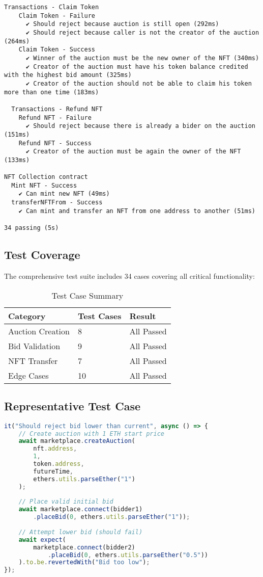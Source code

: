\documentclass{article}
\begin{document}
\begin{lstlisting}[caption={Hardhat Test Results},basicstyle=\footnotesize\ttfamily]
  Transactions - Claim Token
    Claim Token - Failure
      ✔ Should reject because auction is still open (292ms)
      ✔ Should reject because caller is not the creator of the auction (264ms)
    Claim Token - Success
      ✔ Winner of the auction must be the new owner of the NFT (340ms)
      ✔ Creator of the auction must have his token balance credited with the highest bid amount (325ms)
      ✔ Creator of the auction should not be able to claim his token more than one time (183ms)
  
  Transactions - Refund NFT
    Refund NFT - Failure
      ✔ Should reject because there is already a bider on the auction (151ms)
    Refund NFT - Success
      ✔ Creator of the auction must be again the owner of the NFT (133ms)

NFT Collection contract
  Mint NFT - Success
    ✔ Can mint new NFT (49ms)
  transferNFTFrom - Success
    ✔ Can mint and transfer an NFT from one address to another (51ms)

34 passing (5s)
\end{lstlisting}

\subsection{Test Coverage}
The comprehensive test suite includes 34 cases covering all critical functionality:

\begin{table}[h]
\centering
\begin{tabular}{lll}
\toprule
\textbf{Category} & \textbf{Test Cases} & \textbf{Result} \\
\midrule
Auction Creation & 8 & All Passed \\
Bid Validation & 9 & All Passed \\
NFT Transfer & 7 & All Passed \\
Edge Cases & 10 & All Passed \\
\bottomrule
\end{tabular}
\caption{Test Case Summary}
\end{table}

\subsection{Representative Test Case}
\begin{lstlisting}[language=JavaScript,caption={Bid Validation Test}]
it("Should reject bid lower than current", async () => {
    // Create auction with 1 ETH start price
    await marketplace.createAuction(
        nft.address, 
        1, 
        token.address, 
        futureTime, 
        ethers.utils.parseEther("1")
    );
    
    // Place valid initial bid
    await marketplace.connect(bidder1)
        .placeBid(0, ethers.utils.parseEther("1"));
    
    // Attempt lower bid (should fail)
    await expect(
        marketplace.connect(bidder2)
            .placeBid(0, ethers.utils.parseEther("0.5"))
    ).to.be.revertedWith("Bid too low");
});
\end{lstlisting}
\end{document}
